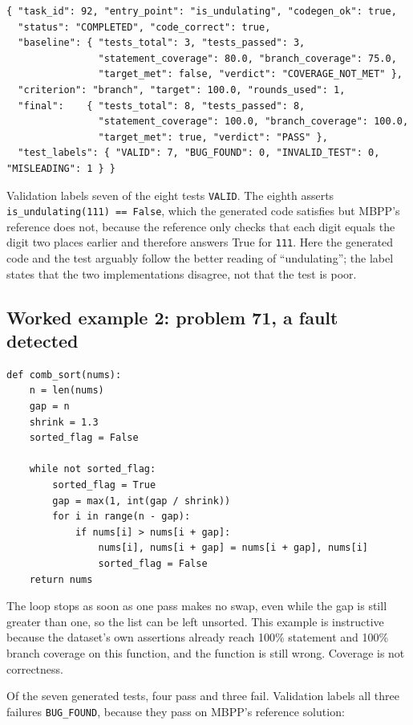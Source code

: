\documentclass[11pt,a4paper]{article}
\begin{document}
\begin{lstlisting}[style=plain]
{ "task_id": 92, "entry_point": "is_undulating", "codegen_ok": true,
  "status": "COMPLETED", "code_correct": true,
  "baseline": { "tests_total": 3, "tests_passed": 3,
                "statement_coverage": 80.0, "branch_coverage": 75.0,
                "target_met": false, "verdict": "COVERAGE_NOT_MET" },
  "criterion": "branch", "target": 100.0, "rounds_used": 1,
  "final":    { "tests_total": 8, "tests_passed": 8,
                "statement_coverage": 100.0, "branch_coverage": 100.0,
                "target_met": true, "verdict": "PASS" },
  "test_labels": { "VALID": 7, "BUG_FOUND": 0, "INVALID_TEST": 0, "MISLEADING": 1 } }
\end{lstlisting}

Validation labels seven of the eight tests \texttt{VALID}. The eighth asserts
\texttt{is\_undulating(111) == False}, which the generated code satisfies but MBPP's reference does not,
because the reference only checks that each digit equals the digit two places earlier and therefore answers
True for \texttt{111}. Here the generated code and the test arguably follow the better reading of
``undulating''; the label states that the two implementations disagree, not that the test is poor.

\subsection{Worked example 2: problem 71, a fault detected}

\begin{lstlisting}[style=py]
def comb_sort(nums):
    n = len(nums)
    gap = n
    shrink = 1.3
    sorted_flag = False

    while not sorted_flag:
        sorted_flag = True
        gap = max(1, int(gap / shrink))
        for i in range(n - gap):
            if nums[i] > nums[i + gap]:
                nums[i], nums[i + gap] = nums[i + gap], nums[i]
                sorted_flag = False
    return nums
\end{lstlisting}

The loop stops as soon as one pass makes no swap, even while the gap is still greater than one, so the list can
be left unsorted. This example is instructive because the dataset's own assertions already reach 100\%
statement and 100\% branch coverage on this function, and the function is still wrong. Coverage is not
correctness.

Of the seven generated tests, four pass and three fail. Validation labels all three failures
\texttt{BUG\_FOUND}, because they pass on MBPP's reference solution:
\end{document}
